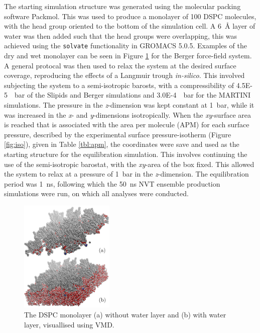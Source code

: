\documentclass[twoside,twocolumn,9pt]{article}
\begin{document}
The starting simulation structure was generated using the molecular packing software Packmol.\cite{Martinez2009}
This was used to produce a monolayer of 100 DSPC molecules, with the head group oriented to the bottom of the simulation cell.
A \SI{6}{\angstrom} layer of water was then added such that the head groups were overlapping, this was achieved using the \texttt{solvate} functionality in GROMACS 5.0.5.
Examples of the dry and wet monolayer can be seen in Figure \ref{fig:drywet} for the Berger force-field system.
A general protocal was then used to relax the system at the desired surface coverage, reproducing the effects of a Langmuir trough \emph{in-silico}.
This involved subjecting the system to a semi-isotropic barosts, with a compressibility of \SI{4.5E-5}{\per\bar} of the Slipids and Berger simulations and \SI{3.0E-4}{\per\bar} for the MARTINI simulations.
The pressure in the \emph{z}-dimension was kept constant at \SI{1}{\bar}, while it was increased in the \emph{x}- and \emph{y}-dimensions isotropically.
When the \emph{xy}-surface area is reached that is associated with the area per molecule (APM) for each surface pressure, described by the experimental surface pressure-isotherm (Figure \ref{fig:iso}), given in Table \ref{tbl:apm}, the coordinates were save and used as the starting structure for the equilibration simulation.
This involves continuing the use of the semi-isotropic barostat, with the \emph{xy}-area of the box fixed.
This allowed the system to relax at a pressure of \SI{1}{\bar} in the \emph{z}-dimension.
The equilibration period was \SI{1}{\nano\second}, following which the \SI{50}{\nano\second} NVT ensemble production simulations were run, on which all analyses were conducted.
%
\begin{figure}[h]
\centering
  \includegraphics[width=0.4\textwidth]{figures/dspcdrywet}
  \caption{The DSPC monolayer (a) without water layer and (b) with water layer, visuallised using VMD.\cite{Humphrey1996}}
  \label{fig:drywet}
\end{figure}
\end{document}
